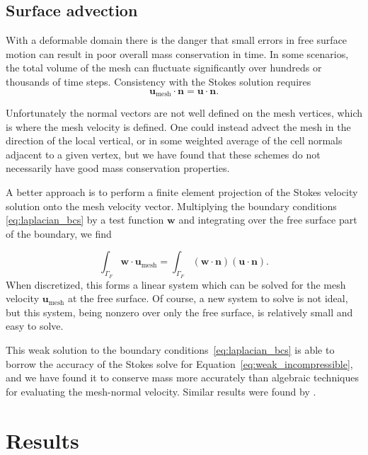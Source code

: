\documentclass[preprint,12pt,authoryear]{elsarticle}
\begin{document}
\subsection{Surface advection}
With a deformable domain there is the danger that small errors in free surface motion can
result in poor overall mass conservation in time. In some scenarios, the total volume of the mesh can 
fluctuate significantly over hundreds or thousands of time steps.
Consistency with the Stokes solution requires 
\begin{equation}
\mathbf{u}_{\mathrm{mesh}} \cdot \mathbf{n} = \mathbf{u \cdot n}.
\end{equation}

Unfortunately the normal vectors are not well defined on the mesh vertices, which is 
where the mesh velocity is defined. One could instead advect the mesh in the direction 
of the local vertical, or in some weighted average of the cell normals adjacent to a given vertex,
but we have found that these schemes do not necessarily have good mass conservation 
properties.

A better approach is to perform a finite element projection of the Stokes velocity 
solution onto the mesh velocity vector. Multiplying the boundary conditions 
\eqref{eq:laplacian_bcs} by a test function $\mathbf{w}$ and integrating over the free
surface part of the boundary, we find

\begin{equation}
\int_{\Gamma_F} \mathbf{w} \cdot \mathbf{u}_\mathrm{mesh} = 
\int_{\Gamma_F} \left( \mathbf{w \cdot n } \right) \left( \mathbf{u \cdot n} \right).
\end{equation}
When discretized, this forms a linear system which can be solved for the mesh velocity $\mathbf{u}_\mathrm{mesh}$ at the 
free surface. Of course, a new system to solve is not ideal, but this system, being nonzero 
over only the free surface, is relatively small and easy to solve.

This weak solution to the boundary conditions~\eqref{eq:laplacian_bcs} is able to borrow
the accuracy of the Stokes solve for Equation~\eqref{eq:weak_incompressible}, and we have 
found it to conserve mass more accurately than algebraic techniques for evaluating the mesh-normal velocity.
Similar results were found by \citet{fullsack1995arbitrary}.

\section{Results}
\end{document}
